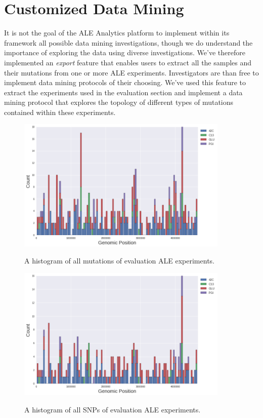 \documentclass[12pt,final,masters,chapterheads]{ucsd}  %
\begin{document}
\section{Customized Data Mining}
It is not the goal of the ALE Analytics platform to implement within its framework all possible data mining investigations, though we do understand the importance of exploring the data using diverse investigations. We've therefore implemented an \textit{export} feature that enables users to extract all the samples and their mutations from one or more ALE experiments. Investigators are than free to implement data mining protocols of their choosing. We've used this feature to extract the experiments used in the evaluation section and implement a data mining protocol that explores the topology of different types of mutations contained within these experiments.
\begin{figure}[H]
  \caption{A histogram of all mutations of evaluation ALE experiments.}
  \centering
  \includegraphics[width=0.9\textwidth]{all_muts_topo.png}
  \label{fig:all_muts_topo}
\end{figure}
\begin{figure}[H]
  \caption{A histogram of all SNPs of evaluation ALE experiments.}
  \centering
  \includegraphics[width=0.9\textwidth]{all_snps_topo.png}
  \label{fig:all_snps_topo}
\end{figure}
\end{document}
